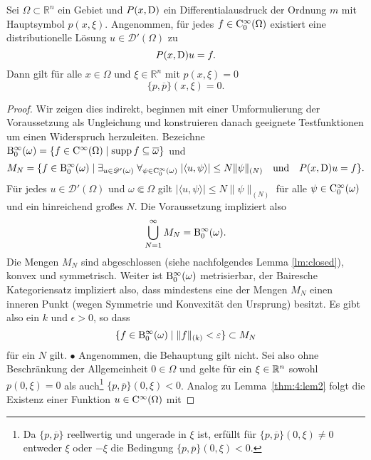 \begin{thm}\label{thm:3.1_hoer}
Sei $\Omega\subset\mathbb{R}^n$ ein Gebiet und $P(x,\mathrm D)$ ein Differentialausdruck der Ordnung $m$ mit Hauptsymbol $p(x,\xi)$.
Angenommen, für jedes $f\in \mathrm C_0^\infty(\Omega)$  existiert eine distributionelle Lösung $u\in\mathscr D'(\Omega)$ zu
\begin{equation}\label{eq:3.1_hoer}
P(x,\mathrm D)u=f.
\end{equation}
Dann gilt für alle $x\in\Omega$ und $\xi\in\mathbb{R}^n$ mit $p(x,\xi)=0$
\begin{equation}\label{eq:3.1_hoer_aussage}
 \{p,\overline{p}\}(x,\xi)=0.
\end{equation}
\end{thm}
\begin{proof}
Wir zeigen dies indirekt, beginnen mit einer Umformulierung der Voraussetzung als Ungleichung und konstruieren danach geeignete Testfunktionen um einen Widerspruch herzuleiten. 
 Bezeichne $\mathrm B^\infty_0(\omega)=\{f\in\mathrm C^\infty(\Omega) \mid \operatorname{supp} f\subseteq\overline\omega\}$ und 
\begin{equation}\label{eq:M_N}
   M_N = \{ f\in \mathrm B^\infty_0(\omega)\mid \exists_{u\in\mathscr D'(\omega)} \; \forall_{\psi\in\mathrm C_0^\infty(\omega)}\; |\langle u,\psi\rangle | \le N \|\psi\|_{(N)} \quad\text{und}\quad P(x,\mathrm D)u=f \}.
\end{equation}
Für jedes $u\in\mathscr D'(\Omega)$ und $\omega\Subset\Omega$ gilt $ |\langle u,\psi\rangle | \le N \|\psi\|_{(N)}$ für alle $\psi\in\mathrm C_0^\infty(\omega)$ und ein hinreichend großes $N$. Die Voraussetzung impliziert also
\begin{equation}
   \bigcup_{N=1}^\infty M_N = \mathrm B^\infty_0(\omega).
\end{equation} 
Die Mengen $M_N$ sind abgeschlossen (siehe nachfolgendes Lemma \ref{lm:closed}),  konvex und symmetrisch. Weiter ist $\mathrm B^\infty_0(\omega)$ metrisierbar, der Bairesche Kategoriensatz impliziert also, dass mindestens eine der Mengen $M_N$ einen inneren Punkt (wegen Symmetrie und Konvexität den Ursprung) besitzt. Es gibt also ein $k$ und $\epsilon>0$, so dass
\begin{equation}\label{eq:fepsInMN}
    \{ f\in \mathrm B^\infty_0(\omega)\mid \|f\|_{(k)}<\varepsilon\} \subset M_N
\end{equation}
für ein $N$ gilt.
%
$\bullet$ 
Angenommen, die Behauptung gilt nicht. Sei also ohne Beschränkung der Allgemeinheit $0\in\Omega$ und gelte für ein $\xi\in\mathbb R^n$ sowohl $p(0,\xi)=0$ als auch\footnote{Da $\{p,\overline p\}$ reellwertig und ungerade in $\xi$ ist, erfüllt für $\{p,\overline p\}(0,\xi)\ne0$ entweder $\xi$ oder $-\xi$ die Bedingung $\{p,\overline p\}(0,\xi)<0$.}   $\{p,\overline p\}(0,\xi)<0$. Analog zu Lemma~\ref{thm:4:lem2} folgt die Existenz einer Funktion $u\in\mathrm C^\infty(\Omega)$ mit 

\end{proof}
